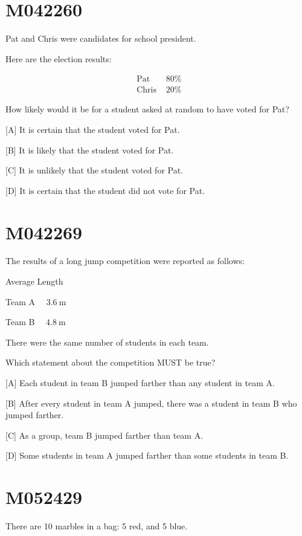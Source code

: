 \documentclass[12pt]{article}
\begin{document}
\newpage
\section*{M042260}

Pat and Chris were candidates for school president.

Here are the election results:

$$
\begin{array}{ll}
\text { Pat } & 80 \% \\
\text { Chris } & 20 \%
\end{array}
$$

How likely would it be for a student asked at random to have voted for Pat?

[A] It is certain that the student voted for Pat.

[B] It is likely that the student voted for Pat.

[C] It is unlikely that the student voted for Pat.

[D] It is certain that the student did not vote for Pat.

\newpage
\section*{M042269}

The results of a long jump competition were reported as follows:

Average Length

Team A $\quad 3.6 \mathrm{~m}$

Team B $\quad 4.8 \mathrm{~m}$

There were the same number of students in each team.

Which statement about the competition MUST be true?

[A] Each student in team B jumped farther than any student in team A.

[B] After every student in team A jumped, there was a student in team B who jumped farther.

[C] As a group, team B jumped farther than team A.

[D] Some students in team A jumped farther than some students in team B.

\newpage
\section*{M052429}

There are 10 marbles in a bag: 5 red, and 5 blue.
\end{document}
